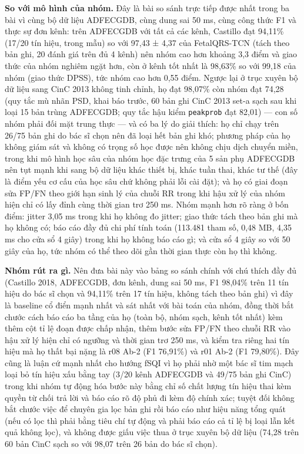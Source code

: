 \documentclass[12pt,a4paper]{article}
\begin{document}
\noindent \textbf{\color{tdtblue}So với mô hình của nhóm.} Đây là bài so sánh trực tiếp được nhất trong ba bài vì cùng bộ dữ liệu ADFECGDB, cùng dung sai 50 ms, cùng công thức F1 và thực sự đơn kênh: trên ADFECGDB với tất cả các kênh, Castillo đạt 94,11\% (17/20 tín hiệu, trong mẫu) so với 97,43 ± 4,37 của FetalQRS-TCN (tách theo bản ghi, 20 đánh giá trên đủ 4 kênh) nên nhóm cao hơn khoảng 3,3 điểm và giao thức của nhóm nghiêm ngặt hơn, còn ở kênh tốt nhất là 98,63\% so với 99,18 của nhóm (giao thức DPSS), tức nhóm cao hơn 0,55 điểm. Ngược lại ở trục xuyên bộ dữ liệu sang CinC 2013 không tinh chỉnh, họ đạt 98,07\% còn nhóm đạt 74,28 (quy tắc mù nhãn PSD, khai báo trước, 60 bản ghi CinC 2013 set-a sạch sau khi loại 15 bản trùng ADFECGDB; quy tắc hậu kiểm \texttt{peakprob} đạt 82,01) — con số nhóm phải đối mặt trung thực — và có ba lý do giải thích: họ chỉ chạy trên 26/75 bản ghi do bác sĩ chọn nên đã loại hết bản ghi khó; phương pháp của họ không giám sát và không có trọng số học được nên không chịu dịch chuyển miền, trong khi mô hình học sâu của nhóm học đặc trưng của 5 sản phụ ADFECGDB nên tụt mạnh khi sang bộ dữ liệu khác thiết bị, khác tuần thai, khác tư thế (đây là điểm yếu cơ cấu của học sâu chứ không phải lỗi cài đặt); và họ có giai đoạn sửa FP/FN theo giới hạn sinh lý của chuỗi RR trong khi hậu xử lý của nhóm hiện chỉ có lấy đỉnh cùng thời gian trơ 250 ms. Nhóm mạnh hơn rõ ràng ở bốn điểm: jitter 3,05 ms trong khi họ không đo jitter; giao thức tách theo bản ghi mà họ không có; báo cáo đầy đủ chi phí tính toán (113.481 tham số, 0,48 MB, 4,35 ms cho cửa sổ 4 giây) trong khi họ không báo cáo gì; và cửa sổ 4 giây so với 50 giây của họ, tức nhóm có thể theo dõi gần thời gian thực còn họ thì không.\par\vspace{3pt}
\noindent \textbf{\color{tdtblue}Nhóm rút ra gì.} Nên đưa bài này vào bảng so sánh chính với chú thích đầy đủ (Castillo 2018, ADFECGDB, đơn kênh, dung sai 50 ms, F1 98,04\% trên 11 tín hiệu do bác sĩ chọn và 94,11\% trên 17 tín hiệu, không tách theo bản ghi) vì đây là baseline cổ điển mạnh nhất và sát nhất với bài toán của nhóm, đồng thời bắt chước cách báo cáo ba tầng của họ (toàn bộ, nhóm sạch, kênh tốt nhất) kèm thêm cột tỉ lệ đoạn được chấp nhận, thêm bước sửa FP/FN theo chuỗi RR vào hậu xử lý hiện chỉ có ngưỡng và thời gian trơ 250 ms, và kiểm tra riêng hai tín hiệu mà họ thất bại nặng là r08 Ab-2 (F1 76,91\%) và r01 Ab-2 (F1 79,80\%). Đây cũng là luận cứ mạnh nhất cho hướng fSQI vì họ phải nhờ một bác sĩ tim mạch loại bỏ tín hiệu xấu bằng tay (3/20 kênh ADFECGDB và 49/75 bản ghi CinC) trong khi nhóm tự động hóa bước này bằng chỉ số chất lượng tín hiệu thai kèm quyền từ chối trả lời và báo cáo rõ độ phủ đi kèm độ chính xác; tuyệt đối không bắt chước việc để chuyên gia lọc bản ghi rồi báo cáo như hiệu năng tổng quát (nếu có lọc thì phải bằng tiêu chí tự động và phải báo cáo cả tỉ lệ bị loại lẫn kết quả không lọc), và không được giấu việc thua ở trục xuyên bộ dữ liệu (74,28 trên 60 bản CinC sạch so với 98,07 trên 26 bản do bác sĩ chọn).\par\vspace{3pt}
\vspace{6pt}
\end{document}
